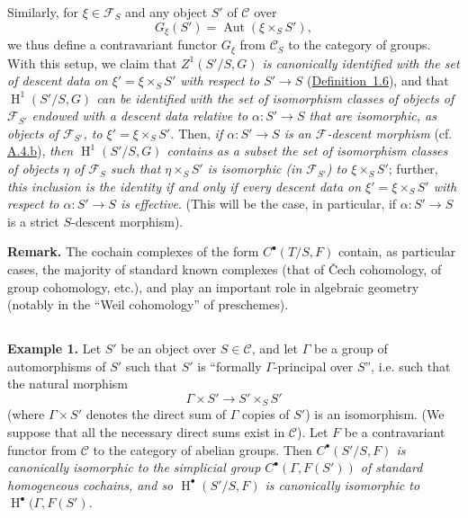 \documentclass{article}
\newenvironment{rmenv}[1]
  {\phantomsection\par\medskip\noindent\textbf{#1.}\rmfamily}
  {\par\medskip}
\renewcommand{\cal}[1]{{\mathcal{#1}}}
\DeclareMathOperator{\Aut}{Aut}
\DeclareMathOperator{\HH}{H}
\newcommand{\oldpage}[1]{\marginpar{\footnotesize$\Big\vert$ \textit{p.~#1}}}
\begin{document}
Similarly, for $\xi\in\cal{F}_S$ and any object $S'$ of $\cal{C}$ over
\[
  G_\xi(S') = \Aut(\xi\times_S S'),
\]
we thus define a contravariant functor $G_\xi$ from $\cal{C}_S$ to the category of
\oldpage{190-14}
groups.
With this setup, we claim that \emph{$Z^1(S'/S,G)$ is canonically identified with the set of descent data on $\xi'=\xi\times_S S'$ with respect to $S'\to S$} (\hyperref[definition:A.1.6]{Definition~1.6}), and that \emph{$\HH^1(S'/S,G)$ can be identified with the set of isomorphism classes of objects of $\cal{F}_{S'}$ endowed with a descent data relative to $\alpha\colon S'\to S$ that are isomorphic, as objects of $\cal{F}_{S'}$, to $\xi'=\xi\times_S S'$.}
Then, \emph{if $\alpha\colon S'\to S$ is an $\cal{F}$-descent morphism} (cf. \hyperref[A.4.b]{A.4.b}), \emph{then $\HH^1(S'/S,G)$ contains as a subset the set of isomorphism classes of objects $\eta$ of $\cal{F}_S$ such that $\eta\times_S S'$ is isomorphic (in $\cal{F}_{S'}$) to $\xi\times_S S'$};
further, \emph{this inclusion is the identity if and only if every descent data on $\xi'=\xi\times_S S'$ with respect to $\alpha\colon S'\to S$ is effective}.
(This will be the case, in particular, if $\alpha\colon S'\to S$ is a strict $S$-descent morphism).

\begin{rmenv}{Remark}
  The cochain complexes of the form $C^\bullet(T/S,F)$ contain, as particular cases, the majority of standard known complexes (that of \v{C}ech cohomology, of group cohomology, etc.), and play an important role in algebraic geometry (notably in the ``Weil cohomology'' of preschemes).
\end{rmenv}


\subsection{}
\label{A.4.d}

\begin{rmenv}{Example 1}
\label{example:A.4.d}
  Let $S'$ be an object over $S\in\cal{C}$, and let $\Gamma$ be a group of automorphisms of $S'$ such that $S'$ is ``formally $\Gamma$-principal over $S$'', i.e. such that the natural morphism
  \[
    \Gamma\times S' \to S'\times_S S'
  \]
  (where $\Gamma\times S'$ denotes the direct sum of $\Gamma$ copies of $S'$) is an isomorphism.
  (We suppose that all the necessary direct sums exist in $\cal{C}$).
  Let $F$ be a contravariant functor from $\cal{C}$ to the category of abelian groups.
  Then \emph{$C^\bullet(S'/S,F)$ is canonically isomorphic to the simplicial group $C^\bullet(\Gamma,F(S'))$ of standard homogeneous cochains, and so $\HH^\bullet(S'/S,F)$ is canonically isomorphic to $\HH^\bullet(\Gamma,F(S')$}.
\end{rmenv}
\end{document}
